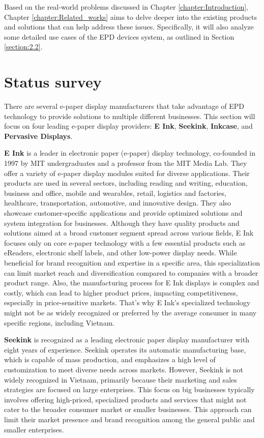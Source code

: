 \documentclass[../Main.tex]{subfiles}
\begin{document}
Based on the real-world problems discussed in Chapter \ref{chapter:Introduction}, Chapter \ref{chapter:Related_works} aims to delve deeper into the existing products and solutions that can help address these issues. Specifically, it will also analyze some detailed use cases of the \gls{EPD} devices system, as outlined in Section \ref{section:2.2}.

\section{Status survey}
\label{section:2.1}
There are several e-paper display manufacturers that take advantage of \gls{EPD} technology to provide solutions to multiple different businesses. This section will focus on four leading e-paper display providers: \textbf{E Ink}, \textbf{Seekink}, \textbf{Inkcase}, and \textbf{Pervasive Displays}.

\textbf{E Ink} is a leader in electronic paper (e-paper) display technology, co-founded in 1997 by MIT undergraduates and a professor from the MIT Media Lab. They offer a variety of e-paper display modules suited for diverse applications. Their products are used in several sectors, including reading and writing, education, business and office, mobile and wearables, retail, logistics and factories, healthcare, transportation, automotive, and innovative design. They also showcase customer-specific applications and provide optimized solutions and system integration for businesses. Although they have quality products and solutions aimed at a broad customer segment spread across various fields, E Ink focuses only on core e-paper technology with a few essential products such as eReaders, electronic shelf labels, and other low-power display needs. While beneficial for brand recognition and expertise in a specific area, this specialization can limit market reach and diversification compared to companies with a broader product range. Also, the manufacturing process for E Ink displays is complex and costly, which can lead to higher product prices, impacting competitiveness, especially in price-sensitive markets. That's why E Ink's specialized technology might not be as widely recognized or preferred by the average consumer in many specific regions, including Vietnam.

\textbf{Seekink} is recognized as a leading electronic paper display manufacturer with eight years of experience. Seekink operates its automatic manufacturing base, which is capable of mass production, and emphasizes a high level of customization to meet diverse needs across markets. However, Seekink is not widely recognized in Vietnam, primarily because their marketing and sales strategies are focused on large enterprises. This focus on big businesses typically involves offering high-priced, specialized products and services that might not cater to the broader consumer market or smaller businesses. This approach can limit their market presence and brand recognition among the general public and smaller enterprises. 
\end{document}
